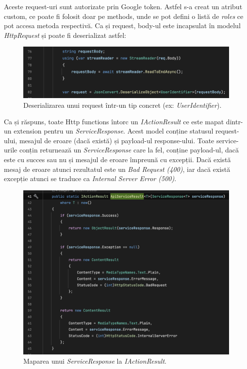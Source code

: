 Aceste request-uri sunt autorizate prin Google token. Astfel s-a creat un atribut custom,
ce poate fi folosit doar pe methods, unde se pot defini o listă de \textit{roles} ce pot
accesa metoda respectivă.
Ca și request, body-ul este incapsulat în modelul \textit{HttpRequest} și poate fi deserializat
astfel:
\begin{figure}[H]
    \centering
    \includegraphics[width=14cm]{Assets/DeserializeRequest.png}
    \caption{Deserializarea unui request într-un tip concret (ex: \textit{UserIdentifier}).}
    \label{fig:DeserializeRequest}
\end{figure}

Ca și răspuns, toate Http functions întorc un \textit{IActionResult} ce este mapat dintr-un extension
pentru un \textit{ServiceResponse}. Acest model conține statusul request-ului, mesajul de eroare (dacă
există) și payload-ul response-ului. Toate service-urile conțin returnează un \textit{ServiceResponse}
care la fel, conține payload-ul, dacă este cu succes sau nu și mesajul de eroare împreună cu excepții.
Dacă există mesaj de eroare atunci rezultatul este un \textit{Bad Request (400)}, iar dacă există
excepție atunci se traduce ca \textit{Internal Server Error (500)}.

\begin{figure}[H]
    \centering
    \includegraphics[width=14cm]{Assets/HttpResponse.png}
    \caption{Maparea unui \textit{ServiceResponse} la \textit{IActionResult}.}
    \label{fig:HttpResponse}
\end{figure}

